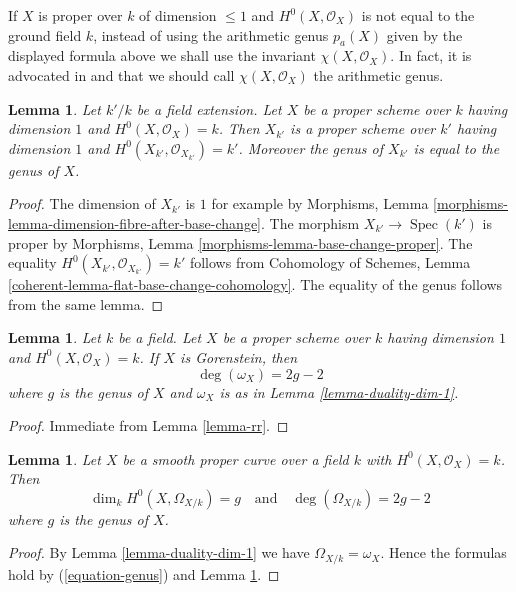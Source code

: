 \documentclass{stacks-project}
\theoremstyle{plain}
\newtheorem{lemma}[subsection]{Lemma}
\theoremstyle{definition}
\theoremstyle{remark}
\numberwithin{equation}{subsection}
\def\Spec{\mathop{\mathrm{Spec}}}
\begin{document}
\medskip\noindent
If $X$ is proper over $k$ of dimension $\leq 1$ and $H^0(X, \mathcal{O}_X)$
is not equal to the ground field $k$, instead of using the arithmetic genus
$p_a(X)$ given by the displayed formula above we shall use the invariant
$\chi(X, \mathcal{O}_X)$. In fact, it is advocated in
\cite[page 276]{FAC} and \cite[Introduction]{Hirzebruch}
that we should call $\chi(X, \mathcal{O}_X)$ the arithmetic genus.

\begin{lemma}
\label{lemma-genus-base-change}
Let $k'/k$ be a field extension. Let $X$ be a proper scheme over $k$ having
dimension $1$ and $H^0(X, \mathcal{O}_X) = k$. Then $X_{k'}$ is a
proper scheme over $k'$
having dimension $1$ and $H^0(X_{k'}, \mathcal{O}_{X_{k'}}) = k'$.
Moreover the genus of $X_{k'}$ is equal to the genus of $X$.
\end{lemma}

\begin{proof}
The dimension of $X_{k'}$ is $1$ for example by
Morphisms, Lemma \ref{morphisms-lemma-dimension-fibre-after-base-change}.
The morphism $X_{k'} \to \Spec(k')$ is proper by
Morphisms, Lemma \ref{morphisms-lemma-base-change-proper}.
The equality $H^0(X_{k'}, \mathcal{O}_{X_{k'}}) = k'$ follows from
Cohomology of Schemes, Lemma
\ref{coherent-lemma-flat-base-change-cohomology}.
The equality of the genus follows from the same lemma.
\end{proof}

\begin{lemma}
\label{lemma-genus-gorenstein}
Let $k$ be a field. Let $X$ be a proper scheme over $k$ having
dimension $1$ and $H^0(X, \mathcal{O}_X) = k$. If $X$ is Gorenstein,
then
$$
\deg(\omega_X) = 2g - 2
$$
where $g$ is the genus of $X$ and $\omega_X$ is as in
Lemma \ref{lemma-duality-dim-1}.
\end{lemma}

\begin{proof}
Immediate from Lemma \ref{lemma-rr}.
\end{proof}

\begin{lemma}
\label{lemma-genus-smooth}
Let $X$ be a smooth proper curve over a field $k$
with $H^0(X, \mathcal{O}_X) = k$. Then
$$
\dim_k H^0(X, \Omega_{X/k}) = g
\quad\text{and}\quad
\deg(\Omega_{X/k}) = 2g - 2
$$
where $g$ is the genus of $X$.
\end{lemma}

\begin{proof}
By Lemma \ref{lemma-duality-dim-1} we have $\Omega_{X/k} = \omega_X$.
Hence the formulas hold by (\ref{equation-genus}) and
Lemma \ref{lemma-genus-gorenstein}.
\end{proof}
\end{document}
